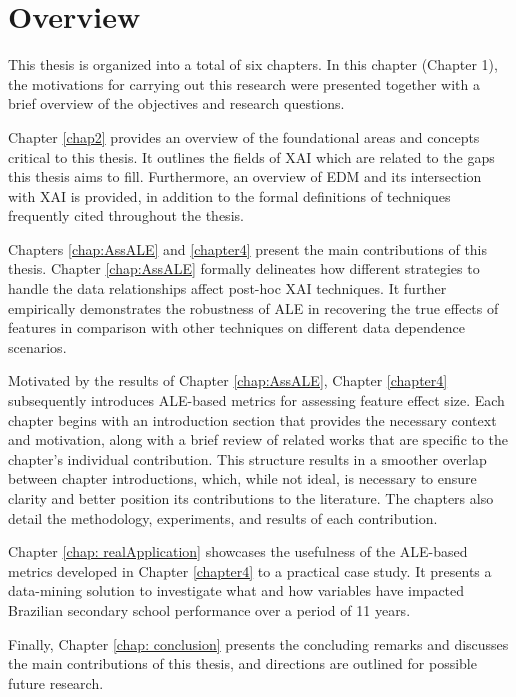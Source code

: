 \section{Overview}
\label{overview}

This thesis is organized into a total of six chapters. In this chapter (Chapter 1), the motivations for carrying out this research were presented together with a brief overview of the objectives and research questions.

Chapter \ref{chap2} provides an overview of the foundational areas and concepts critical to this thesis. It outlines the fields of \gls{XAI} which are related to the gaps this thesis aims to fill. Furthermore, an overview of \gls{EDM} and its intersection with \gls{XAI} is provided, in addition to the formal definitions of techniques frequently cited throughout the thesis. 

Chapters \ref{chap:AssALE} and \ref{chapter4} present the main contributions of this thesis. Chapter \ref{chap:AssALE} formally delineates how different strategies to handle the data relationships affect post-hoc XAI techniques. It further empirically demonstrates the robustness of ALE in recovering the true effects of features in comparison with other techniques on different data dependence scenarios. 

Motivated by the results of Chapter \ref{chap:AssALE}, Chapter \ref{chapter4} subsequently introduces \gls{ALE}-based metrics for assessing feature effect size. Each chapter begins with an introduction section that provides the necessary context and motivation, along with a brief review of related works that are specific to the chapter’s individual contribution. This structure results in a smoother overlap between chapter introductions, which, while not ideal, is necessary to ensure clarity and better position its contributions to the literature. The chapters also detail the methodology, experiments, and results of each contribution. 

Chapter \ref{chap: realApplication} showcases the usefulness of the \gls{ALE}-based metrics developed in Chapter \ref{chapter4} to a practical case study. It presents a data-mining solution to investigate what and how variables have impacted Brazilian secondary school performance over a period of 11 years. 

Finally, Chapter \ref{chap: conclusion} presents the concluding remarks and discusses the main contributions of this thesis, and directions are outlined for possible future research.

